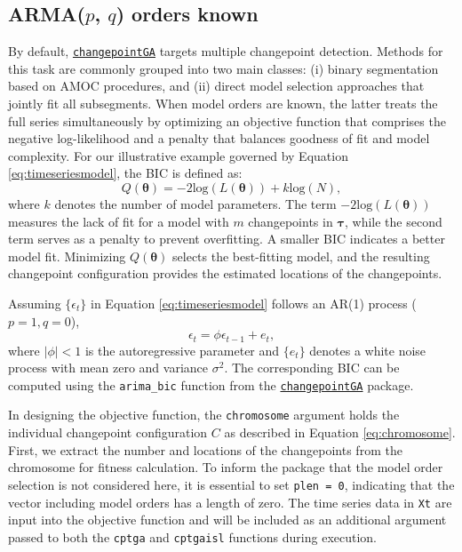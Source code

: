 \subsection{\texorpdfstring{ARMA(\(p\), \(q\)) orders known}{ARMA(p, q) orders known}}\label{armap-q-orders-known}

By default, \href{https://CRAN.R-project.org/package=changepointGA}{\texttt{changepointGA}} targets multiple changepoint detection. Methods for this task are commonly grouped into two main classes: (i) binary segmentation based on AMOC procedures, and (ii) direct model selection approaches that jointly fit all subsegments. When model orders are known, the latter treats the full series simultaneously by optimizing an objective function that comprises the negative log-likelihood and a penalty that balances goodness of fit and model complexity. For our illustrative example governed by Equation \eqref{eq:timeseriesmodel}, the BIC is defined as:
\begin{equation}
    Q(\boldsymbol{\theta}) = -2\text{log}(L(\boldsymbol{\theta}))+k\text{log}(N),  
    \label{eq:MultipleBIC}
\end{equation}
where \(k\) denotes the number of model parameters. The term \(-2\text{log}(L(\boldsymbol{\theta}))\) measures the lack of fit for a model with \(m\) changepoints in \(\boldsymbol{\tau}\), while the second term serves as a penalty to prevent overfitting. A smaller BIC indicates a better model fit. Minimizing \(Q(\boldsymbol{\theta})\) selects the best-fitting model, and the resulting changepoint configuration provides the estimated locations of the changepoints.

Assuming \(\{\epsilon_{t}\}\) in Equation \eqref{eq:timeseriesmodel} follows an AR(1) process (\(p=1, q=0\)),
\begin{equation}
\epsilon_{t} = \phi\epsilon_{t-1} + e_{t}, 
\label{eq:ar1}
\end{equation}
where \(|\phi| < 1\) is the autoregressive parameter and \(\{e_t\}\) denotes a white noise process with mean zero and variance \(\sigma^2\). The corresponding BIC can be computed using the \texttt{arima\_bic} function from the \href{https://CRAN.R-project.org/package=changepointGA}{\texttt{changepointGA}} package.

In designing the objective function, the \texttt{chromosome} argument holds the individual changepoint configuration \(C\) as described in Equation \eqref{eq:chromosome}. First, we extract the number and locations of the changepoints from the chromosome for fitness calculation. To inform the package that the model order selection is not considered here, it is essential to set \texttt{plen\ =\ 0}, indicating that the vector including model orders has a length of zero. The time series data in \texttt{Xt} are input into the objective function and will be included as an additional argument passed to both the \texttt{cptga} and \texttt{cptgaisl} functions during execution.

